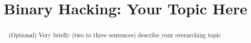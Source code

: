\documentclass[conference,dvipsnames]{IEEEtran}
\begin{document}
\title{Binary Hacking: Your Topic Here}

\author{
}

\maketitle

\begin{abstract}
	(Optional) Very briefly (two to three sentences) describe your overarching topic
\end{abstract}









\clearpage
%
\end{document}
